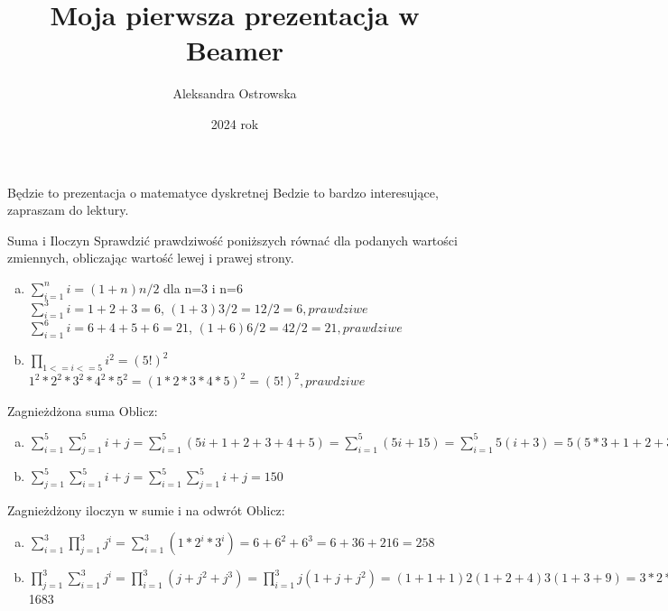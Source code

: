 \documentclass{beamer}
\title{Moja pierwsza prezentacja w Beamer}
\author{Aleksandra Ostrowska}
\date{2024 rok}
\begin{document}
\begin{frame}
\titlepage
\end{frame}

\begin{frame}{Będzie to prezentacja o matematyce dyskretnej}
Bedzie to bardzo interesujące, zapraszam do lektury.
\end{frame}

\begin{frame}{Suma i Iloczyn}
Sprawdzić prawdziwość poniższych równać dla podanych wartości zmiennych, obliczając wartość lewej i prawej strony.
\begin{enumerate}[a)]
\item $\sum_{i=1}^{n}i=(1+n)n/2$ dla n=3 i n=6\\
$\sum_{i=1}^{3}i=1+2+3=6$, $(1+3)3/2=12/2=6, prawdziwe$\\
$\sum_{i=1}^{6}i=6+4+5+6=21$, $(1+6)6/2=42/2=21, prawdziwe$
\pause
\item $\prod_{1<=i<=5}i^{2}=(5!)^2$\\
$1^{2}*2^{2}*3^{2}*4^{2}*5^{2}=(1*2*3*4*5)^{2}=(5!)^2, prawdziwe$ \cite{Dyskretna}
\end{enumerate}
\end{frame}

\begin{frame}{Zagnieżdżona suma}
Oblicz:
\begin{enumerate}[a)]
\item $\sum_{i=1}^{5}\sum_{j=1}^{5}i+j=\sum_{i=1}^{5}(5i+1+2+3+4+5)=\sum_{i=1}^{5}(5i+15)=\sum_{i=1}^{5}5(i+3)=5(5*3+1+2+3+4+5)=5*(15+15)=5*30=150$
\pause 
\item $\sum_{j=1}^{5}\sum_{i=1}^{5}i+j=\sum_{i=1}^{5}\sum_{j=1}^{5}i+j=150$
\end{enumerate}
\end{frame}

\begin{frame}{Zagnieżdżony iloczyn w sumie i na odwrót}
Oblicz:
\begin{enumerate}[a)]
\item  $\sum_{i=1}^{3}\prod_{j=1}^{3}j^i=\sum_{i=1}^{3}(1*2^{i}*3^{i})=6+6^{2}+6^{3}=6+36+216=258$
\pause
\item  $\prod_{j=1}^{3}\sum_{i=1}^{3}j^i=\prod_{i=1}^{3}(j+j^{2}+j^{3})=\prod_{i=1}^{3}j(1+j+j^2)=(1+1+1)2(1+2+4)3(1+3+9)=3*2*3*7*13=$1683
\end{enumerate}
\end{frame}
\end{document}
